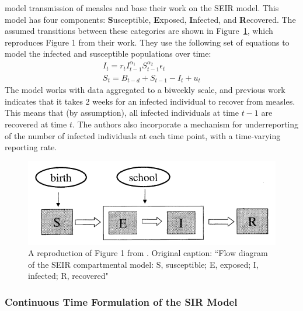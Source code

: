 \documentclass[fleqn]{article}\usepackage[]{graphicx}\usepackage[]{color}
\begin{document}
\cite{finkenstadt2000TimeSeriesDiseasesDynamicalSystems} model transmission of measles and base their work on the SEIR model.  This model has four components: \textbf{S}usceptible, \textbf{E}xposed, \textbf{I}nfected, and \textbf{R}ecovered.  The assumed transitions between these categories are shown in Figure~\ref{fig:FinkenstadtGrenfell2000SEIRDynamics}, which reproduces Figure 1 from their work.  They use the following set of equations to model the infected and susceptible populations over time:
\begin{align}
I_t = r_t I_{t - 1}^{\alpha_1} S_{t - 1}^{\alpha_2} \epsilon_t \label{eqn:FinkenstadtGrenfell2000It} \\
S_t = B_{t - d} + S_{t - 1} - I_t + u_t \label{eqn:FinkenstadtGrenfell2000St}
\end{align}
The model works with data aggregated to a biweekly scale, and previous work indicates that it takes 2 weeks for an infected individual to recover from measles.  This means that (by assumption), all infected individuals at time $t - 1$ are recovered at time $t$.  The authors also incorporate a mechanism for underreporting of the number of infected individuals at each time point, with a time-varying reporting rate.


\begin{figure}
\includegraphics[width=\textwidth]{images/FinkenstadtGrenfell2000/SEIRDynamics.png} 
\caption{A reproduction of Figure 1 from \cite{finkenstadt2000TimeSeriesDiseasesDynamicalSystems}.  Original caption: ``Flow diagram of the SEIR compartmental model: S, susceptible; E, exposed; I, infected; R, recovered"}
\label{fig:FinkenstadtGrenfell2000SEIRDynamics}
\end{figure}


\subsubsection{Continuous Time Formulation of the SIR Model}
\label{subsubsec:ModelFormulation:SIR:ContinuousTime}

\end{document}

